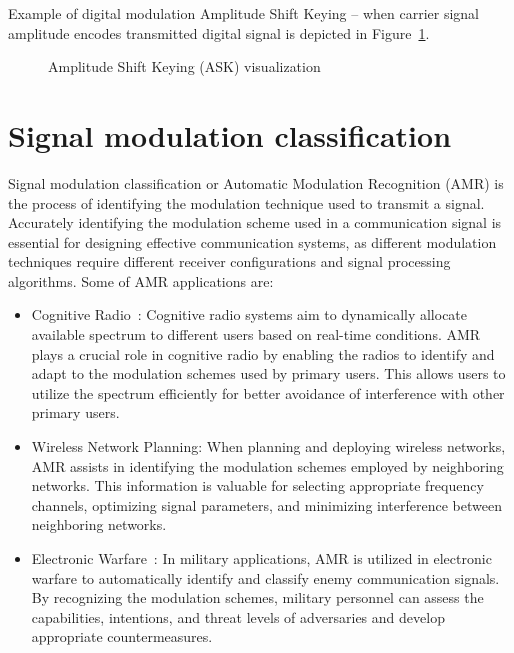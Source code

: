 Example of digital modulation Amplitude Shift Keying -- when carrier signal amplitude encodes transmitted digital signal is depicted in Figure~\ref{fig:ask}.

\begin{figure}[t]
\centering
\caption{Amplitude Shift Keying (ASK) visualization~\cite{pysdr} }

\label{fig:ask}
\end{figure}

\section{Signal modulation classification}

Signal modulation classification or Automatic Modulation Recognition (AMR) is the process of identifying the modulation technique used to transmit a signal. Accurately identifying the modulation scheme used in a communication signal is essential for designing effective communication systems, as different modulation techniques require different receiver configurations and signal processing algorithms. Some of AMR applications are:



\begin{itemize}
    \item Cognitive Radio~\cite{cognitive_radio_amr}: Cognitive radio systems aim to dynamically allocate available spectrum to different users based on real-time conditions. AMR plays a crucial role in cognitive radio by enabling the radios to identify and adapt to the modulation schemes used by primary users. This allows users to utilize the spectrum efficiently for better avoidance of interference with other primary users.
    \item Wireless Network Planning: When planning and deploying wireless networks, AMR assists in identifying the modulation schemes employed by neighboring networks. This information is valuable for selecting appropriate frequency channels, optimizing signal parameters, and minimizing interference between neighboring networks.
    \item Electronic Warfare~\cite{amr_warfare}: In military applications, AMR is utilized in electronic warfare to automatically identify and classify enemy communication signals. By recognizing the modulation schemes, military personnel can assess the capabilities, intentions, and threat levels of adversaries and develop appropriate countermeasures.
\end{itemize}




